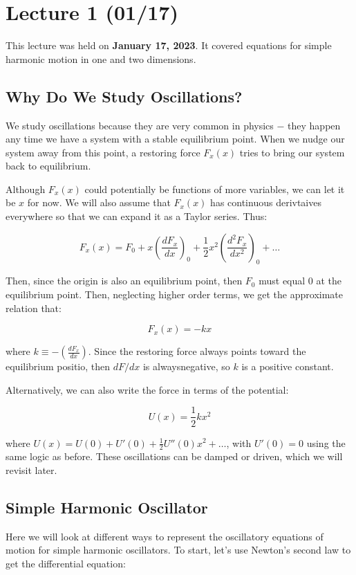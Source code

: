 \chapter{Lecture 1 (01/17)}

This lecture was held on \textbf{January 17, 2023}. It covered equations for simple harmonic motion in one and two dimensions.

\section{Why Do We Study Oscillations?}

We study oscillations because they are very common in physics $-$ they happen any time we have a system with a stable equilibrium point. When we nudge our system away from this point, a restoring force $F_x(x)$ tries to bring our system back to equilibrium. 

Although $F_x(x)$ could potentially be functions of more variables, we can let it be $x$ for now. We will also assume that $F_x(x)$ has continuous derivtaives everywhere so that we can expand it as a Taylor series. Thus: 

\[ F_x(x) = F_0 + x\left(\frac{dF_x}{dx}\right)_{0} + \frac12 x^2 \left(\frac{d^2F_x}{dx^2}\right)_{0} + \dots\]

Then, since the origin is also an equilibrium point, then $F_0$ must equal 0 at the equilibrium point. Then, neglecting higher order terms, we get the approximate relation that: 

\[ F_x(x) = -kx\] 

where $k \equiv -\left( \frac{dF_x}{dx}\right)$. Since the restoring force always points toward the equilibrium positio, then $dF/dx$ is alwaysnegative, so $k$ is a positive constant.

Alternatively, we can also write the force in terms of the potential: 

\[ U(x) = \frac 12 kx^2\]

where $U(x) = U(0) + U'(0) + \frac 12 U''(0)x^2 + \dots$, with $U'(0) = 0$ using the same logic as before. These oscillations can be damped or driven, which we will revisit later.

\section{Simple Harmonic Oscillator}

Here we will look at different ways to represent the oscillatory equations of motion for simple harmonic oscillators. To start, let's use Newton's second law to get the differential equation:

